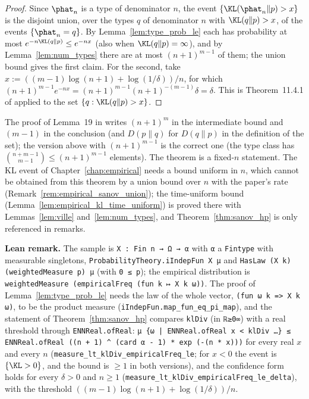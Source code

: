 \begin{proof}
\leanok
Since $\phat_n$ is a type of denominator $n$, the event $\{\KL(\phat_n \| p) > x\}$ is the
disjoint union, over the types $q$ of denominator $n$ with $\KL(q \| p) > x$, of the events
$\{\phat_n = q\}$. By Lemma~\ref{lem:type_prob_le} each has probability at most
$e^{-n \KL(q \| p)} \le e^{-nx}$ (also when $\KL(q\|p) = \infty$), and by Lemma~\ref{lem:num_types}
there are at most $(n + 1)^{m - 1}$ of them; the union bound gives the first claim. For the
second, take $x := ((m - 1)\log(n + 1) + \log(1/\delta))/n$, for which
$(n + 1)^{m - 1} e^{-nx} = (n + 1)^{m - 1} (n + 1)^{-(m - 1)} \delta = \delta$.
This is Theorem~11.4.1 of \cite{cover2006elements} applied to the set
$\{q : \KL(q \| p) > x\}$.
\end{proof}

\begin{remark}\label{rem:pconc_sanov_paper}
The proof of Lemma~19 in \cite{essakine2026tight} writes $(n + 1)^m$ in the intermediate
bound and $(m - 1)$ in the conclusion (and $D(p \| q)$ for $D(q \| p)$ in the definition of the
set); the version above with $(n + 1)^{m - 1}$ is the correct one (the type class has
$\binom{n + m - 1}{m - 1} \le (n + 1)^{m - 1}$ elements). The theorem is a fixed-$n$ statement.
The KL event of Chapter~\ref{chap:empirical} needs a bound uniform in $n$, which cannot be
obtained from this theorem by a union bound over $n$ with the paper's rate
(Remark~\ref{rem:empirical_sanov_union}); the time-uniform bound
(Lemma~\ref{lem:empirical_kl_time_uniform}) is proved there with Lemmas~\ref{lem:ville}
and~\ref{lem:num_types}, and Theorem~\ref{thm:sanov_hp} is only referenced in remarks.
\end{remark}

\textbf{Lean remark.} The sample is \texttt{X : Fin n → Ω → α} with \texttt{α} a
\texttt{Fintype} with measurable singletons, \texttt{ProbabilityTheory.iIndepFun X μ} and
\texttt{HasLaw (X k) (weightedMeasure p) μ} (with \texttt{0 ≤ p}); the empirical distribution is
\texttt{weightedMeasure (empiricalFreq (fun k ↦ X k ω))}. The proof of
Lemma~\ref{lem:type_prob_le} needs the law of the whole vector, \texttt{(fun ω k => X k ω)},
to be the product measure (\texttt{iIndepFun.map\_fun\_eq\_pi\_map}), and the statement of
Theorem~\ref{thm:sanov_hp} compares \texttt{klDiv} (in \texttt{ℝ≥0∞}) with a real threshold
through \texttt{ENNReal.ofReal}: \texttt{μ \{ω | ENNReal.ofReal x < klDiv …\} ≤ ENNReal.ofReal
((n + 1) \^{} (card α - 1) * exp (-(n * x)))} for every real $x$ and every $n$
(\texttt{measure\_lt\_klDiv\_empiricalFreq\_le}; for $x < 0$ the event is $\{\KL > 0\}$, and the bound
is $\ge 1$ in both versions), and the confidence form holds for every $\delta > 0$ and $n \ge 1$
(\texttt{measure\_lt\_klDiv\_empiricalFreq\_le\_delta}), with the threshold
$((m - 1)\log(n + 1) + \log(1/\delta))/n$.

